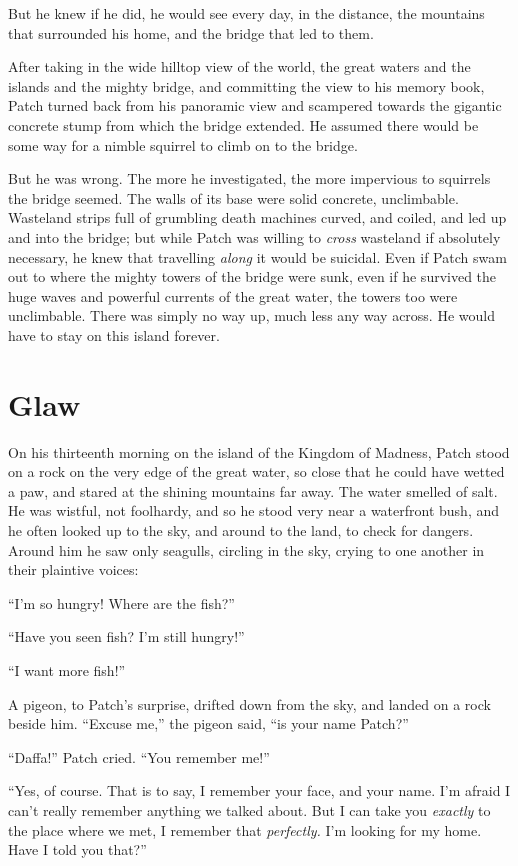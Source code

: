 \documentclass[ebook,oneside,openany,12pt]{memoir}
\begin{document}
But he knew if he did, he would see every day, in the distance, the
mountains that surrounded his home, and the bridge that led to them.

After taking in the wide hilltop view of the world, the great waters
and the islands and the mighty bridge, and committing the view to his
memory book, Patch turned back from his panoramic view and scampered
towards the gigantic concrete stump from which the bridge extended. He
assumed there would be some way for a nimble squirrel to climb on to
the bridge.

But he was wrong. The more he investigated, the more impervious to
squirrels the bridge seemed. The walls of its base were solid
concrete, unclimbable. Wasteland strips full of grumbling death
machines curved, and coiled, and led up and into the bridge; but while
Patch was willing to \emph{cross} wasteland if absolutely necessary,
he knew that travelling \emph{along} it would be suicidal. Even if
Patch swam out to where the mighty towers of the bridge were sunk,
even if he survived the huge waves and powerful currents of the great
water, the towers too were unclimbable. There was simply no way up,
much less any way across. He would have to stay on this island
forever.


\section{Glaw}

On his thirteenth morning on the island of the Kingdom of Madness,
Patch stood on a rock on the very edge of the great water, so close
that he could have wetted a paw, and stared at the shining mountains
far away. The water smelled of salt. He was wistful, not foolhardy,
and so he stood very near a waterfront bush, and he often looked up to
the sky, and around to the land, to check for dangers. Around him he
saw only seagulls, circling in the sky, crying to one another in their
plaintive voices:

“I’m so hungry! Where are the fish?”

“Have you seen fish? I’m still hungry!”

“I want more fish!”

A pigeon, to Patch’s surprise, drifted down from the sky, and landed
on a rock beside him. “Excuse me,” the pigeon said, “is your name
Patch?”

“Daffa!” Patch cried. “You remember me!”

“Yes, of course. That is to say, I remember your face, and your
name. I’m afraid I can’t really remember anything we talked about. But
I can take you \emph{exactly} to the place where we met, I remember
that \emph{perfectly.} I’m looking for my home. Have I told you
that?”
\end{document}
